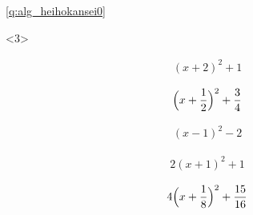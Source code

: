 \ref{q:alg_heihokansei0} 
\begin{edaenumerate}<3>
\item \begin{eqnarray*}(x + 2)^2 + 1\end{eqnarray*}
\item \begin{eqnarray*}\Bigl(x + \frac{1}{2}\Bigr)^2 + \frac{3}{4}\end{eqnarray*}
\item \begin{eqnarray*}(x - 1)^2 - 2\end{eqnarray*}
\item \begin{eqnarray*}2(x+1)^2 + 1\end{eqnarray*}
\item \begin{eqnarray*}4\Bigl(x+\frac{1}{8}\Bigr)^2 + \frac{15}{16}\end{eqnarray*}
\end{edaenumerate}
\mv


